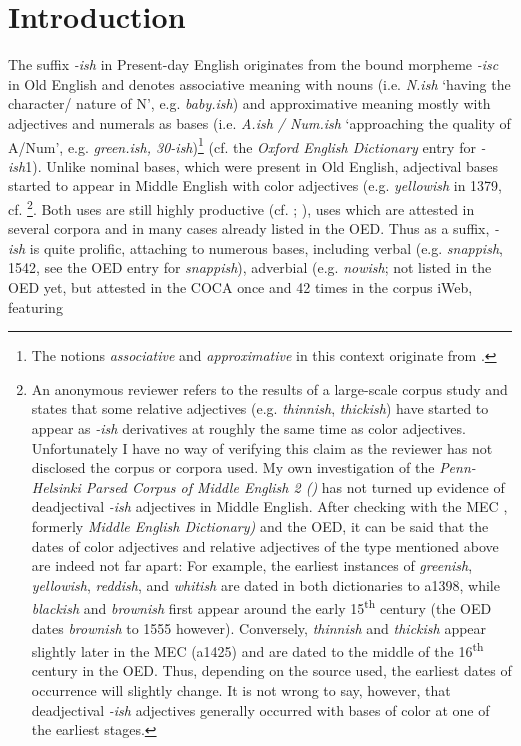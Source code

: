 \documentclass[output=paper
,modfonts
,nonflat]{langsci/langscibook}
\author{Tabea Harris\affiliation{University of Mannheim}}
\begin{document}
\maketitle
{}
\section{Introduction} 
The suffix \textit{-ish} in Present-day English originates from the bound morpheme \textit{-isc} in Old English and denotes associative meaning with nouns (i.e. \textit{N.ish} `having the character/ nature of N', e.g. \textit{baby.ish}) and approximative meaning mostly with adjectives and numerals as bases (i.e. \textit{A.ish / Num.ish} `approaching the quality of A/Num', e.g. \textit{green.ish, 30-ish})\footnote{The notions \textit{associative} and \textit{approximative} in this context originate from \citet*{Traugott2013}.} (cf. the \textit{Oxford English Dictionary} \citet{OED2015} entry for \textit{-ish}1). Unlike nominal bases, which were present in Old English, adjectival bases started to appear in Middle English with color adjectives (e.g. \textit{yellowish} in 1379, cf. \textcite[306]{Marchand1969} \footnote{An anonymous reviewer refers to the results of a large-scale corpus study and states that some relative adjectives (e.g. \textit{thinnish}, \textit{thickish}) have started to appear as \textit{-ish} derivatives at roughly the same time as color adjectives. Unfortunately I have no way of verifying this claim as the reviewer has not disclosed the corpus or corpora used. My own investigation of the \textit{Penn-Helsinki Parsed Corpus of Middle English 2 (\citet{PPCME2})} has not turned up evidence of deadjectival \textit{-ish} adjectives in Middle English. After checking with the MEC \citep{MED-MEC}, formerly \textit{Middle English Dictionary)} and the OED, it can be said that the dates of color adjectives and relative adjectives of the type mentioned above are indeed not far apart: For example, the earliest instances of \textit{greenish}, \textit{yellowish}, \textit{reddish}, and \textit{whitish} are dated in both dictionaries to a1398, while \textit{blackish} and \textit{brownish} first appear around the early 15\textsuperscript{th} century (the OED dates \textit{brownish} to 1555 however). Conversely, \textit{thinnish} and \textit{thickish} appear slightly later in the MEC (a1425) and are dated to the middle of the 16\textsuperscript{th} century in the OED. Thus, depending on the source used, the earliest dates of occurrence will slightly change. It is not wrong to say, however, that deadjectival \textit{-ish} adjectives generally occurred with bases of color at one of the earliest stages.}. Both uses are still highly productive (cf. \textcite[305]{Bauer2013}; \textcite[235]{Dixon2014} ), uses which are attested in several corpora and in many cases already listed in the OED. Thus as a suffix,  \textit{-ish} is quite prolific, attaching to numerous bases, including verbal (e.g.  \textit{snappish}, 1542, see the OED entry for \textit{snappish}), adverbial (e.g.  \textit{nowish}; not listed in the OED yet, but attested in the COCA \citet{Davies2008} once and 42 times in the corpus iWeb, featuring 
\end{document}
